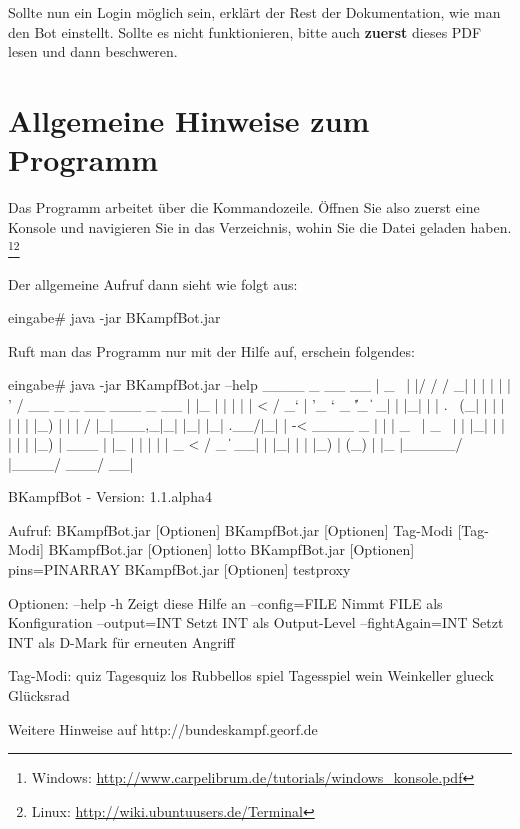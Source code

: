 \documentclass{scrartcl}
\begin{document}
Sollte nun ein Login möglich sein, erklärt der Rest der Dokumentation, wie man den Bot einstellt. Sollte es nicht funktionieren, bitte auch \textbf{zuerst} dieses PDF lesen und dann beschweren.

\section{Allgemeine Hinweise zum Programm}
Das Programm arbeitet über die Kommandozeile. Öffnen Sie also zuerst eine Konsole und navigieren Sie in das Verzeichnis, wohin Sie die Datei geladen haben. \footnote{Windows: \url{http://www.carpelibrum.de/tutorials/windows_konsole.pdf}}\footnote{Linux: \url{http://wiki.ubuntuusers.de/Terminal}}

 

Der allgemeine Aufruf dann sieht wie folgt aus: 

\begin{code}
eingabe# java -jar BKampfBot.jar
\end{code}

Ruft man das Programm nur mit der Hilfe auf, erschein folgendes:

\begin{code}[emph={help},basicstyle=\tiny\ttfamily]
eingabe# java -jar BKampfBot.jar --help
 ____    _  __                      __ 
|  _  \ | |/ /                     / _|
| | | | | ' / __ _ _ __ ___  _ __ | |_
| | | | |  < / _` | '_ ` _ \| '_ \|  _|
| |_| | | . \ (_| | | | | | | |_) | |
|     / |_|\_\__,_|_| |_| |_| .__/|_|
|   -<   ____        _      | |
|  _  \ |  _ \      | |     |_|
| | | | | |_) | ___ | |_
| | | | |  _ < / _ \| __|
| |_| | | |_) | (_) | |_
|_____/ |____/ \___/ \__|


BKampfBot - Version: 1.1.alpha4

Aufruf: BKampfBot.jar [Optionen]
        BKampfBot.jar [Optionen] Tag-Modi [Tag-Modi]
        BKampfBot.jar [Optionen] lotto
        BKampfBot.jar [Optionen] pins=PINARRAY
		BKampfBot.jar [Optionen] testproxy

Optionen:
  --help  -h     		Zeigt diese Hilfe an
  --config=FILE  		Nimmt FILE als Konfiguration
  --output=INT   		Setzt INT als Output-Level
  --fightAgain=INT		Setzt INT als D-Mark für erneuten Angriff

Tag-Modi:
  quiz           Tagesquiz
  los            Rubbellos
  spiel          Tagesspiel
  wein           Weinkeller
  glueck         Glücksrad

Weitere Hinweise auf http://bundeskampf.georf.de

\end{code}
\end{document}
